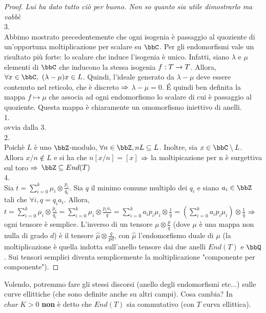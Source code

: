 \begin{proof} {\it Lui ha dato tutto ciò per buono. Non so quanto sia utile dimostrarlo ma vabbè}\\
3.\\
Abbimo mostrato precedentemente che ogni isogenia è passaggio al quoziente di un'opportuna moltiplicazione per scalare su $\bbC$. Per gli endomorfismi vale un risultato più forte: lo scalare che induce l'isogenia è unico.
Infatti, siano $\lambda$ e $\mu$ elementi di $\bbC$ che inducono la stessa isogenia $f:T\rightarrow T$. Allora, $\forall x\in \bbC,  \ (\lambda - \mu)x \in L$. Quindi, l'ideale generato da $\lambda -\mu$ deve essere contenuto nel reticolo, che è discreto $\Rightarrow$ $\lambda - \mu = 0$. \'E quindi ben definita la mappa $f \mapsto \mu$ che associa ad ogni endomorfismo lo scalare di cui è passaggio al quoziente. Questa mappa è chiaramente un omomorfismo iniettivo di anelli.\\
1.\\
ovvia dalla 3.\\
2.\\
Poichè $L$ è uno $\bbZ$-modulo, $\forall n \in \bbZ, nL\subseteq L$. Inoltre, sia $x\in \bbC \setminus L$. Allora $x/n \not\in L$ e si ha che $n[x/n]=[x]$ $\Rightarrow$ la moltipicazione per n è surgettiva sul toro $\Rightarrow$ $\bbZ \subseteq End(T)$\\
4.\\
Sia $t=\sum\limits_{i=0}^{k} \mu_{i} \otimes \frac{p_{i}}{q_{i}}$. Sia $q$ il minimo comune multiplo dei $q_{i}$ e siano $a_{i} \in \bbZ$ tali che $\forall i, q=q_{i}a_{i}$. Allora,\\
$t=\sum\limits_{i=0}^{k} \mu_{i}\otimes \frac{p_{i}}{q_{i}} = \sum\limits_{i=0}^{k} \mu_{i} \otimes \frac{p_{i}a_{i}}{q}= \sum\limits_{i=0}^{k} a_{i}p_{i}\mu_{i}\otimes \frac{1}{q} = (\sum\limits_{i=0}^{k} a_{i}p_{i}\mu_{i})\otimes \frac{1}{q}$ $\Rightarrow$ ogni tensore è semplice. L'inverso di un tensore $\mu \otimes \frac{p}{q}$ (dove $\mu$ è una mappa non nulla di grado $d$) è il tensore $\hat{\mu} \otimes \frac{q}{pd}$, con $\hat{\mu}$ l'endomorfismo duale di $\mu$ (la moltiplicazione è quella indotta sull'anello tensore dai due anelli $End(T)$ e $\bbQ$. Sui tensori semplici diventa semplicemente la moltiplicazione "componente per componente").
\end{proof}

Volendo, potremmo fare gli stessi discorsi (anello degli endomorfismi etc...) sulle curve ellittiche (che sono definite anche su altri campi). Cosa cambia? In $char \ K >0$ {\bf non } è detto che $End(T)$ sia commutativo (con $T$ curva ellittica).\\

